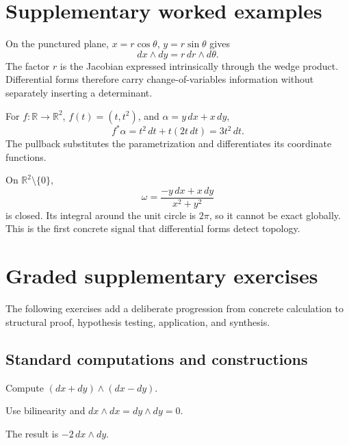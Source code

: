 \section{Supplementary worked examples}
\label{sec:vii09-pedagogy}

\begin{example}\label{ex:vii09-ped-01}
On the punctured plane, \(x=r\cos\theta\), \(y=r\sin\theta\) gives
\[
dx\wedge dy=r\,dr\wedge d\theta.
\]
The factor \(r\) is the Jacobian expressed intrinsically through the wedge product.  Differential forms therefore carry change-of-variables information without separately inserting a determinant.
\end{example}

\begin{example}\label{ex:vii09-ped-02}
For \(f:\mathbb R\to\mathbb R^2\), \(f(t)=(t,t^2)\), and \(\alpha=y\,dx+x\,dy\),
\[
f^*\alpha=t^2\,dt+t(2t\,dt)=3t^2\,dt.
\]
The pullback substitutes the parametrization and differentiates its coordinate functions.
\end{example}

\begin{example}\label{ex:vii09-ped-03}
On \(\mathbb R^2\setminus\{0\}\),
\[
\omega=\frac{-y\,dx+x\,dy}{x^2+y^2}
\]
is closed.  Its integral around the unit circle is \(2\pi\), so it cannot be exact globally.  This is the first concrete signal that differential forms detect topology.
\end{example}

\section{Graded supplementary exercises}
The following exercises add a deliberate progression from concrete calculation to structural proof, hypothesis testing, application, and synthesis.

\subsection*{Standard computations and constructions}

\begin{exercise}\label{exr:vii09-ped-01}
Compute \((dx+dy)\wedge(dx-dy)\).
\end{exercise}
\begin{hint}
Use bilinearity and \(dx\wedge dx=dy\wedge dy=0\).
\end{hint}
\begin{solution}
The result is \(-2\,dx\wedge dy\).
\end{solution}

